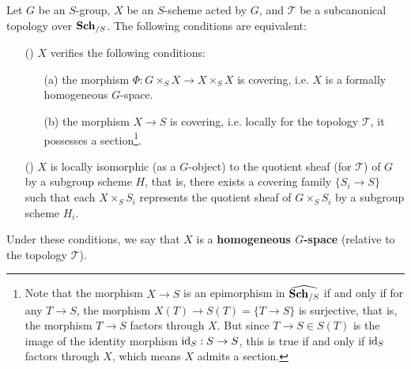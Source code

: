 \begin{proposition}\label{scheme formally homogeneous iff}
Let $G$ be an $S$-group, $X$ be an $S$-scheme acted by $G$, and $\mathcal{T}$ be a subcanonical topology over $\mathbf{Sch}_{/S}$. The following conditions are equivalent:
\begin{enumerate}
    \item[(\rmnum{1})] $X$ verifies the following conditions:
    \begin{enumerate}
        \item[(a)] the morphism $\Phi:G\times_SX\to X\times_SX$ is covering, i.e. $X$ is a formally homogeneous $G$-space.
        \item[(b)] the morphism $X\to S$ is covering, i.e. locally for the topology $\mathcal{T}$, it possesses a section\footnote{Note that the morphism $X\to S$ is an epimorphism in $\widehat{\mathbf{Sch}_{/S}}$ if and only if for any $T\to S$, the morphism $X(T)\to S(T)=\{T\to S\}$ is surjective, that is, the morphism $T\to S$ factors through $X$. But since $T\to S\in S(T)$ is the image of the identity morphism $\operatorname{id}_S:S\to S$, this is true if and only if $\operatorname{id}_S$ factors through $X$, which means $X$ admits a section.}.
    \end{enumerate}
    \item[(\rmnum{2})] $X$ is locally isomorphic (as a $G$-object) to the quotient sheaf (for $\mathcal{T}$) of $G$ by a subgroup scheme $H$, that is, there exists a covering family $\{S_i\to S\}$ such that each $X\times_SS_i$ represents the quotient sheaf of $G\times_SS_i$ by a subgroup scheme $H_i$.
\end{enumerate}
Under these conditions, we say that $X$ is a \textbf{homogeneous $G$-space} (relative to the topology $\mathcal{T}$).
\end{proposition}
